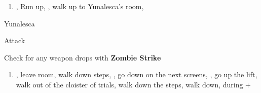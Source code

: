 \begin{enumerate}[resume]
	\item \save, Run up, \sd, walk up to Yunalesca's room, \sd
\end{enumerate}
\begin{battle}[132000]{Yunalesca}
\begin{itemize}
	\summon{\bahamut}
	\bahamutf Attack
\end{itemize}
Check for any weapon drops with \textbf{Zombie Strike}
\end{battle}
\begin{enumerate}[resume]
	\item \sd, leave room, walk down steps, \sd, go down on the next screens, \save, go up the lift, walk out of the cloister of trials, walk down the steps, walk down, \sd during \cs+\skippablefmv
\end{enumerate}